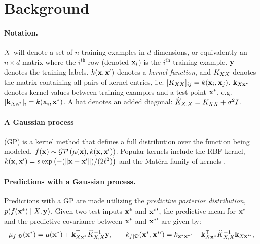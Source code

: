 \section{Background}

\paragraph{Notation.}
$X$ will denote a set of $n$ training examples in $d$ dimensions, or equivalently an $n \times d$ matrix where the $i^{\text{th}}$ row (denoted $\mathbf{x}_{i}$) is the $i^\text{th}$ training example.
$\mathbf{y}$ denotes the training labels.
$k(\mathbf{x}, \mathbf{x}')$ denotes a \emph{kernel function}, and $K_{XX}$ denotes the matrix containing all pairs of kernel entries, i.e. $[K_{XX}]_{ij} = k(\mathbf{x}_{i}, \mathbf{x}_{j})$.
$\mathbf{k}_{X\mathbf{x}^{*}}$ denotes kernel values between training examples and a test point $\mathbf{x}^{*}$, e.g. $[\mathbf{k}_{X\mathbf{x}^{*}}]_{i} = k(\mathbf{x}_{i}, \mathbf{x}^{*})$.
A hat denotes an added diagonal: $\widehat{K}_{X,X} = K_{XX} + \sigma^{2}I$.

\paragraph{A Gaussian process} (GP) is a kernel method that defines a full distribution over the function being modeled, $f(\mathbf{x}) \sim \mathcal{GP} \left( \mu(\mathbf{x}), k(\mathbf{x},\mathbf{x}^{\prime}) \right)$.
Popular kernels include the RBF kernel, $k(\mathbf{x}, \mathbf{x}^{\prime}) = s\exp\left(-(\Vert \mathbf{x} - \mathbf{x}^{\prime} \Vert)/(2\ell^{2})\right)$ and the Mat\'ern family of kernels \cite{rasmussen2006gaussian}.

\paragraph{Predictions with a Gaussian process.}
Predictions with a GP are made utilizing the \emph{predictive posterior distribution}, $p(f(\mathbf{x}^{*})\mid X,\mathbf{y})$. Given two test inputs $\mathbf{x}^{*}$ and $\mathbf{x}^{*\prime}$, the predictive mean for $\mathbf{x}^{*}$ and the predictive covariance between $\mathbf{x}^{*}$ and $\mathbf{x}^{*\prime}$ are given by:
%
\begin{align}
  \mu_{f \mid \mathcal D}(\mathbf{x}^*) = \mu(\mathbf{x}^*) + \mathbf{k}_{X \mathbf{x}^*}^\top \widehat{K}_{X,X}^{-1} \mathbf{y},
  &&&&
  k_{f\mid\mathcal D}(\mathbf{x}^*, \mathbf{x}^{*\prime}) = k_{\mathbf{x}^{*} \mathbf{x}^{*\prime}} - \mathbf{k}_{X \mathbf{x}^{*}}^\top \widehat{K}_{X,X}^{-1} \mathbf{k}_{X \mathbf{x}^{*\prime}},
    \label{eq:pred_mean_covar}
\end{align}
%
